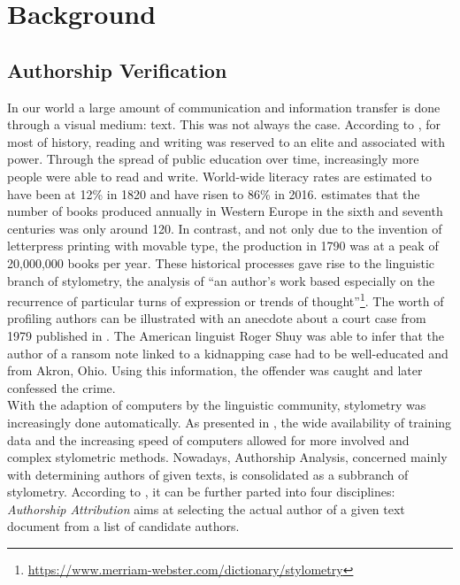 \chapter{Background}\label{ch:background}
\section{Authorship Verification}\label{sec:authorship-verification}
In our world a large amount of communication and information transfer is done through a visual medium: text.
This was not always the case.
According to \cite{owidliteracy}, for most of history, reading and writing was reserved to an elite and associated with power.
Through the spread of public education over time, increasingly more people were able to read and write.
World-wide literacy rates are estimated to have been at 12\% in 1820 and have risen to 86\% in 2016.
\cite{buringh2009charting} estimates that the number of books produced annually in Western Europe in the sixth and seventh centuries was only around 120.
In contrast, and not only due to the invention of letterpress printing with movable type, the production in 1790 was at a peak of 20,000,000 books per year.
These historical processes gave rise to the linguistic branch of stylometry, the analysis of ``an author's work based especially on the recurrence of particular turns of expression or trends of thought''\footnote{\url{https://www.merriam-webster.com/dictionary/stylometry}}.
The worth of profiling authors can be illustrated with an anecdote about a court case from 1979 published in \cite{hitt2012shuyCase}.
The American linguist Roger Shuy was able to infer that the author of a ransom note linked to a kidnapping case had to be well-educated and from Akron, Ohio.
Using this information, the offender was caught and later confessed the crime.\\
With the adaption of computers by the linguistic community, stylometry was increasingly done automatically.
As presented in \cite{stamatatos2009survey}, the wide availability of training data and the increasing speed of computers allowed for more involved and complex stylometric methods.
Nowadays, Authorship Analysis, concerned mainly with determining authors of given texts, is consolidated as a subbranch of stylometry.
According to \cite{bevendorff2020shared}, it can be further parted into four disciplines:\\
\textit{Authorship Attribution} aims at selecting the actual author of a given text document from a list of candidate authors.
